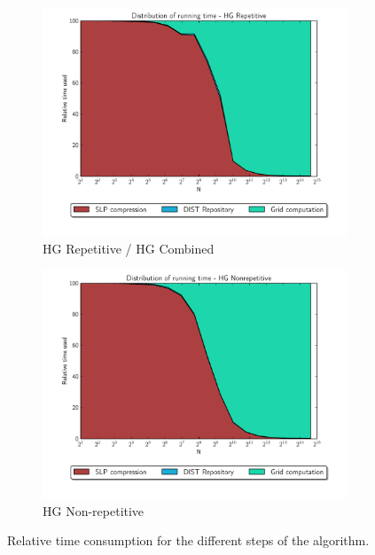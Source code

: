 \documentclass[twoside,11pt,openright]{report}
\begin{document}
\begin{figure}[!ht]
  \begin{subfigure}{0.49\textwidth}
    \centering
    \includegraphics[width=\textwidth]{combined/hg_repetitive_area_plot}
    \caption{HG Repetitive / HG Combined}
    \label{fig:benchmark:relative-runningtime-hg-repetitive}
  \end{subfigure}
  \begin{subfigure}{0.49\textwidth}
    \centering
    \includegraphics[width=\textwidth]{combined/hg_nonrepetitive_area_plot}
    \caption{HG Non-repetitive}
    \label{fig:benchmark:relative-runningtime-hg-nonrepetitive}
  \end{subfigure}
  \caption{Relative time consumption for the different steps of the algorithm.}
  \label{fig:benchmark:relative-runningtime}
\end{figure}
\end{document}
